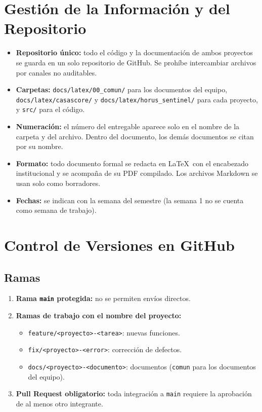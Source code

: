 \documentclass[11pt,a4paper]{article}
\begin{document}
\section{Gestión de la Información y del Repositorio}
\begin{itemize}[leftmargin=*]
    \item \textbf{Repositorio único:} todo el código y la documentación de ambos proyectos se guarda en un solo repositorio de GitHub. Se prohíbe intercambiar archivos por canales no auditables.
    \item \textbf{Carpetas:} \texttt{docs/latex/00\_comun/} para los documentos del equipo, \texttt{docs/latex/casascore/} y \texttt{docs/latex/horus\_sentinel/} para cada proyecto, y \texttt{src/} para el código.
    \item \textbf{Numeración:} el número del entregable aparece solo en el nombre de la carpeta y del archivo. Dentro del documento, los demás documentos se citan por su nombre.
    \item \textbf{Formato:} todo documento formal se redacta en \LaTeX\ con el encabezado institucional y se acompaña de su PDF compilado. Los archivos Markdown se usan solo como borradores.
    \item \textbf{Fechas:} se indican con la semana del semestre (la semana 1 no se cuenta como semana de trabajo).
\end{itemize}

\section{Control de Versiones en GitHub}

\subsection{Ramas}
\begin{enumerate}[leftmargin=*]
    \item \textbf{Rama \texttt{main} protegida:} no se permiten envíos directos.
    \item \textbf{Ramas de trabajo con el nombre del proyecto:}
    \begin{itemize}
        \item \texttt{feature/<proyecto>-<tarea>}: nuevas funciones.
        \item \texttt{fix/<proyecto>-<error>}: corrección de defectos.
        \item \texttt{docs/<proyecto>-<documento>}: documentos (\texttt{comun} para los documentos del equipo).
    \end{itemize}
    \item \textbf{Pull Request obligatorio:} toda integración a \texttt{main} requiere la aprobación de al menos otro integrante.
\end{enumerate}
\end{document}
